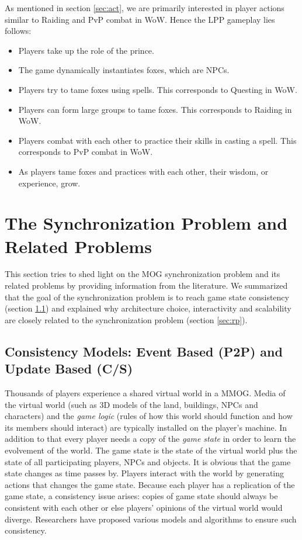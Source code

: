 \documentclass{article}
\begin{document}
As mentioned in section \ref{sec:act}, we are primarily interested in player actions similar to Raiding and PvP combat in WoW. Hence the LPP gameplay lies follows:
\begin{itemize}
\item Players take up the role of the prince.
\item The game dynamically instantiates foxes, which are NPCs.
\item Players try to tame foxes using spells. This corresponds to Questing in WoW.
\item Players can form large groups to tame foxes. This corresponds to Raiding in WoW.
\item Players combat with each other to practice their skills in casting a spell. This corresponds to PvP combat in WoW.
\item As players tame foxes and practices with each other, their wisdom, or experience, grow.
\end{itemize}


\section{The Synchronization Problem and Related Problems}
\label{dfsync}
This section tries to shed light on the MOG synchronization problem and its related problems by providing information from the literature. We summarized that the goal of the synchronization problem is to reach game state consistency (section \ref{sec:cm}) and explained why architecture choice, interactivity and scalability are closely related to the synchronization problem (section \ref{sec:rp}).

\subsection{Consistency Models: Event Based (P2P) and Update Based (C/S)}
\label{sec:cm}
Thousands of players experience a shared virtual world in a MMOG. Media of the virtual world (such as 3D models of the land, buildings, NPCs and characters) and the \emph{game logic} (rules of how this world should function and how its members should interact) are typically installed on the player's machine. In addition to that every player needs a copy of the \emph{game state} in order to learn the evolvement of the world. The game state is the state of the virtual world plus the state of all participating players, NPCs and objects. It is obvious that the game state changes as time passes by. Players interact with the world by generating actions that changes the game state. Because each player has a replication of the game state, a consistency issue arises: copies of game state should always be consistent with each other or else players' opinions of the virtual world would diverge. Researchers have proposed various models and algorithms to ensure such consistency.
\end{document}
